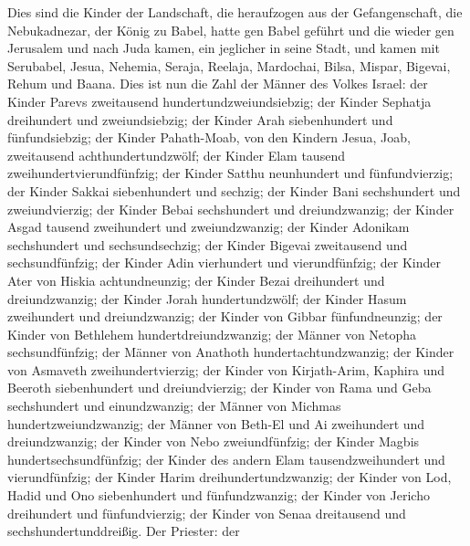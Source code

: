  Dies sind die Kinder der Landschaft, die heraufzogen aus
der Gefangenschaft, die Nebukadnezar, der König zu Babel, hatte gen
Babel geführt und die wieder gen Jerusalem und nach Juda kamen, ein
jeglicher in seine Stadt,  und kamen mit Serubabel, Jesua,
Nehemia, Seraja, Reelaja, Mardochai, Bilsa, Mispar, Bigevai, Rehum und
Baana. Dies ist nun die Zahl der Männer des Volkes Israel: 
der Kinder Parevs zweitausend hundertundzweiundsiebzig;  der
Kinder Sephatja dreihundert und zweiundsiebzig;  der Kinder
Arah siebenhundert und fünfundsiebzig;  der Kinder
Pahath-Moab, von den Kindern Jesua, Joab, zweitausend
achthundertundzwölf;  der Kinder Elam tausend
zweihundertvierundfünfzig;  der Kinder Satthu neunhundert
und fünfundvierzig;  der Kinder Sakkai siebenhundert und
sechzig;  der Kinder Bani sechshundert und zweiundvierzig;
 der Kinder Bebai sechshundert und dreiundzwanzig;
 der Kinder Asgad tausend zweihundert und zweiundzwanzig;
 der Kinder Adonikam sechshundert und sechsundsechzig;
 der Kinder Bigevai zweitausend und sechsundfünfzig;
 der Kinder Adin vierhundert und vierundfünfzig;
 der Kinder Ater von Hiskia achtundneunzig; 
der Kinder Bezai dreihundert und dreiundzwanzig;  der
Kinder Jorah hundertundzwölf;  der Kinder Hasum zweihundert
und dreiundzwanzig;  der Kinder von Gibbar fünfundneunzig;
 der Kinder von Bethlehem hundertdreiundzwanzig;
 der Männer von Netopha sechsundfünfzig;  der
Männer von Anathoth hundertachtundzwanzig;  der Kinder von
Asmaveth zweihundertvierzig;  der Kinder von Kirjath-Arim,
Kaphira und Beeroth siebenhundert und dreiundvierzig;  der
Kinder von Rama und Geba sechshundert und einundzwanzig; 
der Männer von Michmas hundertzweiundzwanzig;  der Männer
von Beth-El und Ai zweihundert und dreiundzwanzig;  der
Kinder von Nebo zweiundfünfzig;  der Kinder Magbis
hundertsechsundfünfzig;  der Kinder des andern Elam
tausendzweihundert und vierundfünfzig;  der Kinder Harim
dreihundertundzwanzig;  der Kinder von Lod, Hadid und Ono
siebenhundert und fünfundzwanzig;  der Kinder von Jericho
dreihundert und fünfundvierzig;  der Kinder von Senaa
dreitausend und sechshundertunddreißig.  Der Priester: der
